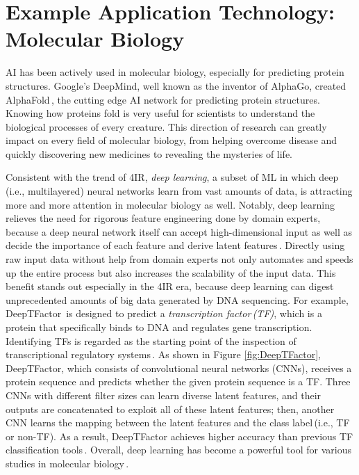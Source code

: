 \documentclass[11pt]{article}
\begin{document}


\section{Example Application Technology: Molecular Biology}

AI has been actively used in molecular biology, especially for predicting protein structures. Google's DeepMind, well known as the inventor of AlphaGo, created AlphaFold\,\cite{AlphaFold}, the cutting edge AI network for predicting protein structures. Knowing how proteins fold is very useful for scientists to understand the biological processes of every creature. This direction of research can greatly impact on every field of molecular biology, from helping overcome disease and quickly discovering new medicines to revealing the mysteries of life.


Consistent with the trend of 4IR, \emph{deep learning}, a subset of ML in which deep\,(i.e., multilayered) neural networks learn from vast amounts of data, is attracting more and more attention in molecular biology as well. Notably, deep learning relieves the need for rigorous feature engineering done by domain experts, because a deep neural network itself can accept high-dimensional input as well as decide the importance of each feature and derive latent features\,\cite{Jisna2021}. Directly using raw input data without help from domain experts not only automates and speeds up the entire process but also increases the scalability of the input data. This benefit stands out especially in the 4IR era, because deep learning can digest unprecedented amounts of big data generated by DNA sequencing. 
For example, DeepTFactor\,\cite{DeepTFactor} is designed to predict a \emph{transcription factor\,(TF)}, which is a protein that specifically binds to DNA and regulates gene transcription. Identifying TFs is regarded as the starting point of the inspection of transcriptional regulatory systems\,\cite{DeepTFactor}. As shown in Figure \ref{fig:DeepTFactor}, DeepTFactor, which consists of convolutional neural networks (CNNs),  receives a protein sequence and predicts whether the given protein sequence is a TF. Three CNNs with different filter sizes can learn diverse latent features, and their outputs are concatenated to exploit all of these latent features; then, another CNN learns the mapping between the latent features and the class label\,(i.e., TF or non-TF). As a result, DeepTFactor achieves higher accuracy than previous TF classification tools\,\cite{DeepTFactor}. Overall, deep learning has become a powerful tool for various studies in molecular biology\,\cite{Webb2018}.
\end{document}
